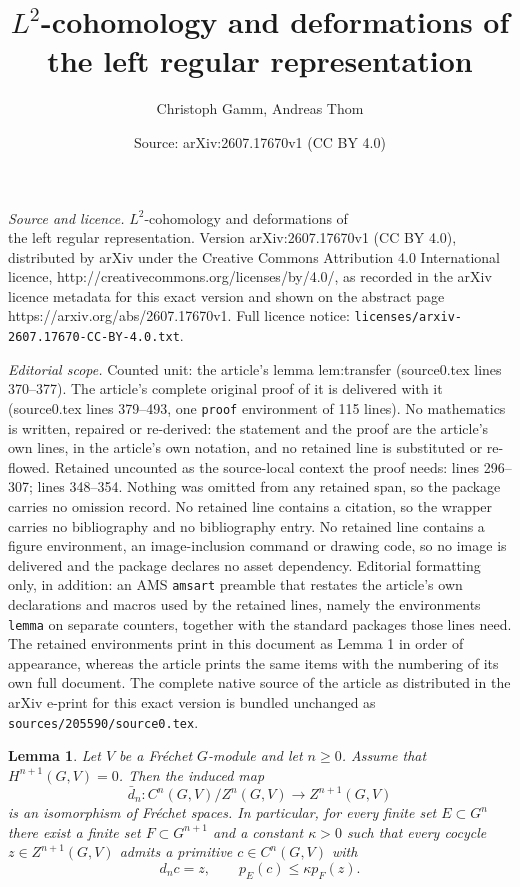 \documentclass[10pt,a4paper]{amsart}
\title{$L^2$-cohomology and deformations of \\ the left regular representation}
\author{Christoph Gamm, Andreas Thom}
\date{Source: arXiv:2607.17670v1 (CC BY 4.0)}
\newtheorem{lemma}{Lemma}
\begin{document}
\maketitle

\noindent\emph{Source and licence.} $L^2$-cohomology and deformations of \\ the left regular representation. Version arXiv:2607.17670v1 (CC BY 4.0), distributed by arXiv under the Creative Commons Attribution 4.0 International licence, http://creativecommons.org/licenses/by/4.0/, as recorded in the arXiv licence metadata for this exact version and shown on the abstract page https://arxiv.org/abs/2607.17670v1. Full licence notice: \texttt{licenses/arxiv-2607.17670-CC-BY-4.0.txt}.\par\smallskip

\noindent\textit{Editorial scope.} Counted unit: the article's lemma lem:transfer (source0.tex lines 370--377). The article's complete original proof of it is delivered with it (source0.tex lines 379--493, one \texttt{proof} environment of 115 lines). No mathematics is written, repaired or re-derived: the statement and the proof are the article's own lines, in the article's own notation, and no retained line is substituted or re-flowed.  Retained uncounted as the source-local context the proof needs: lines 296--307; lines 348--354.  Nothing was omitted from any retained span, so the package carries no omission record.  No retained line contains a citation, so the wrapper carries no bibliography and no bibliography entry.  No retained line contains a figure environment, an image-inclusion command or drawing code, so no image is delivered and the package declares no asset dependency.  Editorial formatting only, in addition: an AMS \texttt{amsart} preamble that restates the article's own declarations and macros used by the retained lines, namely the environments \texttt{lemma} on separate counters, together with the standard packages those lines need.  The retained environments print in this document as Lemma 1 in order of appearance, whereas the article prints the same items with the numbering of its own full document.  The complete native source of the article as distributed in the arXiv e-print for this exact version is bundled unchanged as \texttt{sources/205590/source0.tex}.
\begin{lemma}\label{lem:openmapping}
Let $V$ be a Fr\'echet $G$-module and let $n\ge 0$. Assume that $H^{n+1}(G,V)=0$. Then the induced map
\[
\bar d_n\colon C^n(G,V)/Z^n(G,V)\to Z^{n+1}(G,V)
\]
is an isomorphism of Fr\'echet spaces. In particular, for every finite set $E\subset G^n$ there exist a finite set $F\subset G^{n+1}$ and a constant $\kappa>0$ such that every cocycle $z\in Z^{n+1}(G,V)$ admits a primitive $c\in C^n(G,V)$ with
\[
d_nc=z,
\qquad
p_E(c)\le \kappa p_F(z).
\]
\end{lemma}
\end{document}
